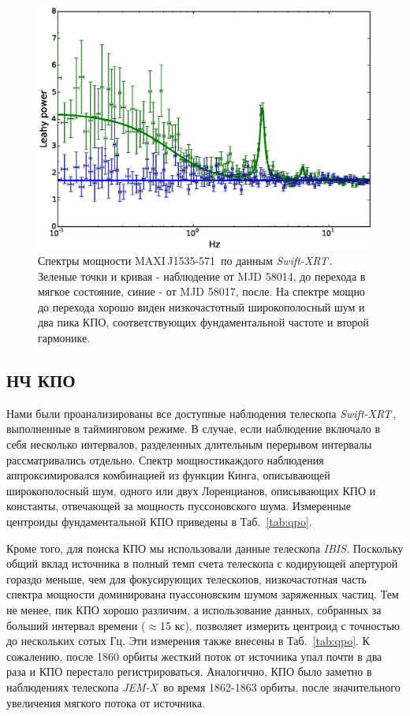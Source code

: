 \documentclass{pazhb}
\def\maxisrc{MAXI\,J1535-571}
\def\swiftx{{\em Swift-XRT\,}}
\def\jemx{{\em JEM-X}}
\def\ibis{ {\em IBIS}}
\begin{document}
\begin{figure}
\centerline{\includegraphics[width=\linewidth]{transition_v01.eps}}
\caption{Спектры мощности \maxisrc\, по данным \swiftx. Зеленые точки и кривая - наблюдение от MJD 58014, до перехода в мягкое состояние, синие - от MJD 58017, после. На спектре мощно до перехода хорошо виден низкочастотный широкополосный шум и два пика КПО, соответствующих фундаментальной частоте и второй гармонике.}
\label{fig:powtrans}
\end{figure}

\subsection{НЧ КПО}
Нами были проанализированы все доступные наблюдения телескопа \swiftx, выполненные в тайминговом режиме. В случае, если наблюдение включало в себя несколько интервалов, разделенных длительным перерывом интервалы рассматривались отдельно. Спектр мощностикаждого наблюдения аппроксимировался комбинацией из функции Кинга, описывающей широкополосный шум, одного или двух Лоренцианов, описывающих КПО и константы, отвечающей за мощность пуссоновского шума. Измеренные центроиды фундаментальной КПО приведены в Таб.~\ref{tab:qpo}. 

Кроме того, для поиска КПО мы использовали данные телескопа \ibis. Поскольку общий вклад источника в полный темп счета телескопа с кодирующей апертурой гораздо меньше, чем для фокусирующих телескопов, низкочастотная часть спектра мощности доминирована пуассоновским шумом заряженных частиц. Тем не менее, пик КПО хорошо различим, а использование данных, собранных за больший интервал времени ($\approx$15 кс), позволяет измерить центроид с точностью до нескольких сотых Гц. Эти измерения также внесены в Таб.~\ref{tab:qpo}. К сожалению, после 1860 орбиты жесткий поток от источника упал почти в два раза и КПО перестало регистрироваться. Аналогично, КПО было заметно в наблюдениях телескопа \jemx\, во время 1862-1863 орбиты, после значительного увеличения мягкого потока от источника. 
\end{document}
